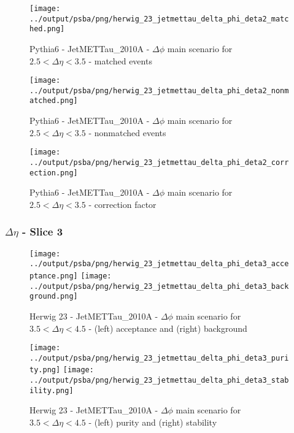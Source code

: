 \documentclass[11pt]{book}
\begin{document}
\begin{figure}[ht]
\centering
\texttt{[image: ../output/psba/png/herwig\_23\_jetmettau\_delta\_phi\_deta2\_matched.png]}
\caption{Pythia6 - JetMETTau\_2010A - $\Delta\phi$ main scenario for $2.5 < \Delta\eta < 3.5$ - matched events}
\label{fig:p6_jetmettau_delta_phi_deta2_matched}
\end{figure}

\begin{figure}[ht]
\centering
\texttt{[image: ../output/psba/png/herwig\_23\_jetmettau\_delta\_phi\_deta2\_nonmatched.png]}
\caption{Pythia6 - JetMETTau\_2010A - $\Delta\phi$ main scenario for $2.5 < \Delta\eta < 3.5$ - nonmatched events}
\label{fig:p6_jetmettau_delta_phi_deta2_nonmatched}
\end{figure}

\begin{figure}[ht]
\centering
\texttt{[image: ../output/psba/png/herwig\_23\_jetmettau\_delta\_phi\_deta2\_correction.png]}
\caption{Pythia6 - JetMETTau\_2010A - $\Delta\phi$ main scenario for $2.5 < \Delta\eta < 3.5$ - correction factor}
\label{fig:p6_jetmettau_delta_phi_deta2_correction}
\end{figure}

\clearpage
\subsubsection{$\Delta\eta$ - Slice 3}

\begin{figure}[ht]
\centering
\texttt{[image: ../output/psba/png/herwig\_23\_jetmettau\_delta\_phi\_deta3\_acceptance.png]}
\texttt{[image: ../output/psba/png/herwig\_23\_jetmettau\_delta\_phi\_deta3\_background.png]}
\caption{Herwig 23 - JetMETTau\_2010A - $\Delta\phi$ main scenario for $3.5 < \Delta\eta < 4.5$ - (left) acceptance and (right) background}
\label{fig:hw_23_jetmettau_delta_phi_deta3_ab}
\end{figure}

\begin{figure}[ht]
\centering
\texttt{[image: ../output/psba/png/herwig\_23\_jetmettau\_delta\_phi\_deta3\_purity.png]}
\texttt{[image: ../output/psba/png/herwig\_23\_jetmettau\_delta\_phi\_deta3\_stability.png]}
\caption{Herwig 23 - JetMETTau\_2010A - $\Delta\phi$ main scenario for $3.5 < \Delta\eta < 4.5$ - (left) purity and (right) stability}
\label{fig:hw_23_jetmettau_delta_phi_deta3_ps}
\end{figure}
\end{document}
